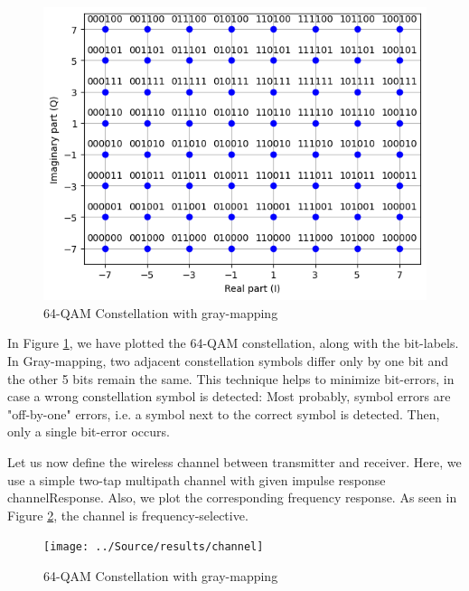 \begin{figure}[htbp]
    \centering
    \includegraphics[width=\textwidth]{../Source/results/mapping}
    \caption{64-QAM Constellation with gray-mapping}
    \label{mapping}
\end{figure}

In Figure \ref{mapping}, we have plotted the 64-QAM constellation, along with the bit-labels. In Gray-mapping, two adjacent constellation symbols differ only by one bit and the other 5 bits remain the same. This technique helps to minimize bit-errors, in case a wrong constellation symbol is detected: Most probably, symbol errors are "off-by-one" errors, i.e. a symbol next to the correct symbol is detected. Then, only a single bit-error occurs.

Let us now define the wireless channel between transmitter and receiver. Here, we use a simple two-tap multipath channel with given impulse response channelResponse. Also, we plot the corresponding frequency response. As seen in Figure \ref{channel}, the channel is frequency-selective.

\begin{figure}[htbp]
    \centering
    \texttt{[image: ../Source/results/channel]}
    \caption{64-QAM Constellation with gray-mapping}
    \label{channel}
\end{figure}

\newpage